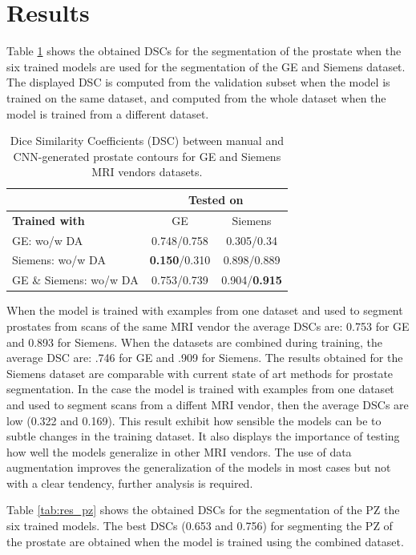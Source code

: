 \section{Results}

Table \ref{tab:res_prost} shows the obtained DSCs for the segmentation of the prostate
when the six trained models are used for the segmentation of the GE and Siemens dataset. 
The displayed DSC is computed from the validation subset when
the model is trained on the same dataset, and computed from the whole dataset when the
model is trained from a different dataset. 
\begin{table}[h]
    \centering
    \begin{tabular}{|l|c|c|}
         \hline
          & \multicolumn{2}{c|}{ \textbf{Tested on} } \\
         \hline
          \textbf{Trained with} &  GE & Siemens  \\
         \hline
         GE: wo/w DA & 0.748/0.758 & 0.305/0.34 \\
         \hline
         Siemens: wo/w DA & \textbf{0.150}/0.310 & 0.898/0.889\\
         \hline
         GE \& Siemens: wo/w DA & 0.753/0.739 & 0.904/\textbf{0.915}\\
         \hline
    \end{tabular}
    \caption{Dice Similarity Coefficients (DSC) between manual and CNN-generated 
    prostate contours for GE and Siemens MRI vendors datasets.}
    \label{tab:res_prost}
\end{table}
When the model is trained with examples from one dataset and used to segment
prostates from scans of the same MRI vendor the average DSCs are: 0.753 for GE 
and 0.893 for Siemens. When the datasets are combined during training, the 
average DSC are: .746 for GE and .909 for Siemens.
The results obtained for the Siemens dataset are comparable with 
current state of art methods for prostate segmentation. In the case the model is 
trained with examples from one dataset and used to segment scans from a diffent 
MRI vendor, then the average DSCs are low (0.322 and 0.169). This result exhibit 
how sensible the models
can be to subtle changes in the training dataset. It also displays the importance 
of testing how well the models generalize in other MRI vendors. 
The use of data augmentation improves the generalization of the models in most cases
but not with a clear tendency, further analysis is required. 

Table \ref{tab:res_pz} shows the obtained DSCs for the segmentation of the PZ
the six trained models.  The best DSCs (0.653 and 0.756) for segmenting the PZ of the prostate are obtained 
when the model is trained using the combined dataset.  

